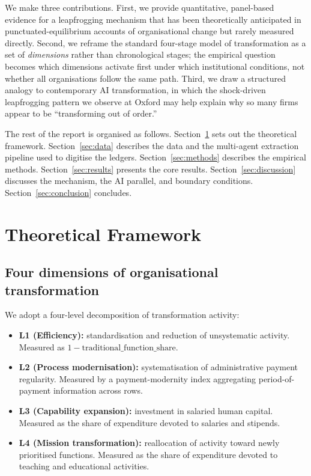 \documentclass[11pt]{article}
\begin{document}
We make three contributions. First, we provide quantitative, panel-based evidence for a leapfrogging mechanism that has been theoretically anticipated in punctuated-equilibrium accounts of organisational change but rarely measured directly. Second, we reframe the standard four-stage model of transformation as a set of \emph{dimensions} rather than chronological stages; the empirical question becomes which dimensions activate first under which institutional conditions, not whether all organisations follow the same path. Third, we draw a structured analogy to contemporary AI transformation, in which the shock-driven leapfrogging pattern we observe at Oxford may help explain why so many firms appear to be ``transforming out of order.''

The rest of the report is organised as follows. Section~\ref{sec:framework} sets out the theoretical framework. Section~\ref{sec:data} describes the data and the multi-agent extraction pipeline used to digitise the ledgers. Section~\ref{sec:methods} describes the empirical methods. Section~\ref{sec:results} presents the core results. Section~\ref{sec:discussion} discusses the mechanism, the AI parallel, and boundary conditions. Section~\ref{sec:conclusion} concludes.

\section{Theoretical Framework}
\label{sec:framework}

\subsection{Four dimensions of organisational transformation}

We adopt a four-level decomposition of transformation activity:
\begin{itemize}
\item \textbf{L1 (Efficiency):} standardisation and reduction of unsystematic activity. Measured as $1 - \text{traditional\_function\_share}$.
\item \textbf{L2 (Process modernisation):} systematisation of administrative payment regularity. Measured by a payment-modernity index aggregating period-of-payment information across rows.
\item \textbf{L3 (Capability expansion):} investment in salaried human capital. Measured as the share of expenditure devoted to salaries and stipends.
\item \textbf{L4 (Mission transformation):} reallocation of activity toward newly prioritised functions. Measured as the share of expenditure devoted to teaching and educational activities.
\end{itemize}
\end{document}

